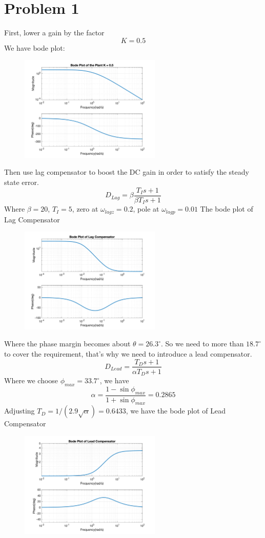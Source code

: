 \documentclass[a4paper]{article}
\begin{document}
\section{Problem 1}
First, lower a gain by the factor
$$
K = 0.5
$$
We have bode plot:
\begin{figure}[H]
\centering
\includegraphics[width = 0.6\textwidth]{pic/0.png}
\end{figure}
\noindent Then use lag compensator to boost the DC gain in order to satisfy the steady state error. 
$$
D_{Lag} = \beta\frac{T_Is+1}{\beta T_Is +1}
$$
Where $\beta = 20$, $T_I = 5$, zero at $\omega_{lagz} = 0.2$, pole at $\omega_{lagp} = 0.01$
The bode plot of Lag Compensator
\begin{figure}[H]
\centering
\includegraphics[width = 0.6\textwidth]{pic/1.png}
\end{figure}
\noindent Where the phase margin becomes about $\theta = 26.3^\circ$. So we need to more than $18.7^\circ$ to cover the requirement, that's why we need to introduce a lead compensator.
$$
D_{Lead} = \frac{T_Ds+1}{\alpha T_Ds +1}
$$
\noindent Where we choose $\phi_{max} = 33.7^\circ$, we have
$$
\alpha = \frac{1-\sin{\phi_{max}}}{1+\sin{\phi_{max}}} = 0.2865
$$
Adjusting $T_D = 1/(2.9\sqrt{\alpha}) = 0.6433$, we have the bode plot of Lead Compensator
\begin{figure}[H]
\centering
\includegraphics[width = 0.6\textwidth]{pic/2.png}
\end{figure}
\end{document}
